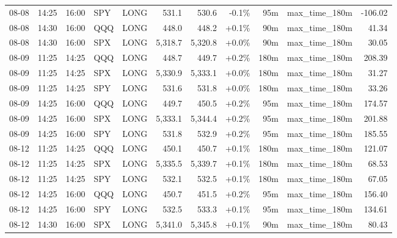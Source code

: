\documentclass[11pt,a4paper,twoside]{article}
\begin{document}
\begin{center}
\begin{longtable}{>{\color{txtmain}}l l l l l r r r r >{\color{txtmain}}l r}
08-08 & 14:25 & 16:00 & SPY & LONG & 531.1 & 530.6 & \textcolor{lossred}{-0.1\%} & 95m & max\_time\_180m & \textcolor{lossred}{-106.02} \\
08-08 & 14:30 & 16:00 & QQQ & LONG & 448.0 & 448.2 & \textcolor{wingreen}{+0.1\%} & 90m & max\_time\_180m & \textcolor{wingreen}{41.34} \\
08-08 & 14:30 & 16:00 & SPX & LONG & 5,318.7 & 5,320.8 & \textcolor{wingreen}{+0.0\%} & 90m & max\_time\_180m & \textcolor{wingreen}{30.05} \\
08-09 & 11:25 & 14:25 & QQQ & LONG & 448.7 & 449.7 & \textcolor{wingreen}{+0.2\%} & 180m & max\_time\_180m & \textcolor{wingreen}{208.39} \\
08-09 & 11:25 & 14:25 & SPX & LONG & 5,330.9 & 5,333.1 & \textcolor{wingreen}{+0.0\%} & 180m & max\_time\_180m & \textcolor{wingreen}{31.27} \\
08-09 & 11:25 & 14:25 & SPY & LONG & 531.6 & 531.8 & \textcolor{wingreen}{+0.0\%} & 180m & max\_time\_180m & \textcolor{wingreen}{33.26} \\
08-09 & 14:25 & 16:00 & QQQ & LONG & 449.7 & 450.5 & \textcolor{wingreen}{+0.2\%} & 95m & max\_time\_180m & \textcolor{wingreen}{174.57} \\
08-09 & 14:25 & 16:00 & SPX & LONG & 5,333.1 & 5,344.4 & \textcolor{wingreen}{+0.2\%} & 95m & max\_time\_180m & \textcolor{wingreen}{201.88} \\
08-09 & 14:25 & 16:00 & SPY & LONG & 531.8 & 532.9 & \textcolor{wingreen}{+0.2\%} & 95m & max\_time\_180m & \textcolor{wingreen}{185.55} \\
08-12 & 11:25 & 14:25 & QQQ & LONG & 450.1 & 450.7 & \textcolor{wingreen}{+0.1\%} & 180m & max\_time\_180m & \textcolor{wingreen}{121.07} \\
08-12 & 11:25 & 14:25 & SPX & LONG & 5,335.5 & 5,339.7 & \textcolor{wingreen}{+0.1\%} & 180m & max\_time\_180m & \textcolor{wingreen}{68.53} \\
08-12 & 11:25 & 14:25 & SPY & LONG & 532.1 & 532.5 & \textcolor{wingreen}{+0.1\%} & 180m & max\_time\_180m & \textcolor{wingreen}{67.05} \\
08-12 & 14:25 & 16:00 & QQQ & LONG & 450.7 & 451.5 & \textcolor{wingreen}{+0.2\%} & 95m & max\_time\_180m & \textcolor{wingreen}{156.40} \\
08-12 & 14:25 & 16:00 & SPY & LONG & 532.5 & 533.3 & \textcolor{wingreen}{+0.1\%} & 95m & max\_time\_180m & \textcolor{wingreen}{134.61} \\
08-12 & 14:30 & 16:00 & SPX & LONG & 5,341.0 & 5,345.8 & \textcolor{wingreen}{+0.1\%} & 90m & max\_time\_180m & \textcolor{wingreen}{80.43} \\

\end{longtable}
\end{center}
\end{document}
